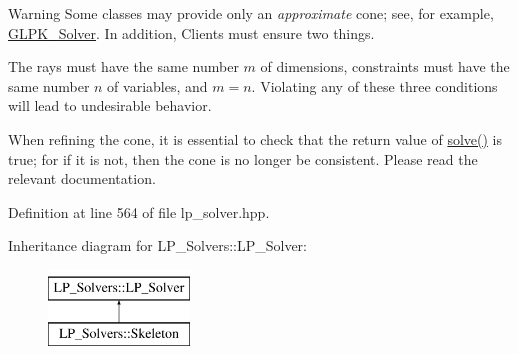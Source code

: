 \begin{DoxyWarning}{Warning}
Some classes may provide only an {\itshape approximate} cone; see, for example, \hyperlink{group___c_l_s_solvers_class_l_p___solvers_1_1_g_l_p_k___solver}{G\+L\+P\+K\+\_\+\+Solver}. In addition, Clients must ensure two things.
\begin{DoxyEnumerate}
\item The rays must have the same number $ m $ of dimensions, constraints must have the same number $ n $ of variables, and $ m=n $. Violating any of these three conditions will lead to undesirable behavior.
\item When refining the cone, it is essential to check that the return value of \hyperlink{group___c_l_s_solvers_a8b9979fb228ac9ccfe037ad6ca48b314}{solve()} is {\ttfamily true}; for if it is not, then the cone is no longer be consistent. Please read the relevant documentation. 
\end{DoxyEnumerate}
\end{DoxyWarning}


Definition at line 564 of file lp\+\_\+solver.\+hpp.

Inheritance diagram for L\+P\+\_\+\+Solvers\+:\+:L\+P\+\_\+\+Solver\+:\begin{figure}[H]
\begin{center}
\leavevmode
\includegraphics[height=2.000000cm]{group___c_l_s_solvers}
\end{center}
\end{figure}
